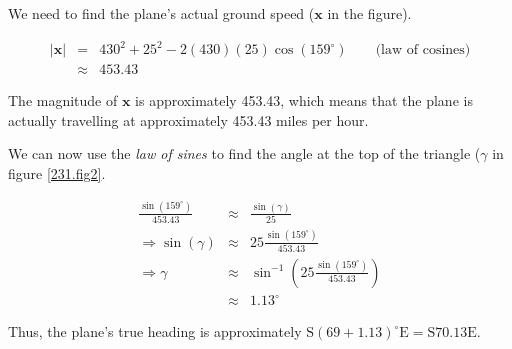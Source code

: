We need to find the plane's actual ground speed ($\mathbf{x}$ in the figure).

\begin{eqnarray*}
	\left|\mathbf{x}\right|&=&430^2+25^2-2\left(430\right)\left(25\right)\cos\left(159^\circ\right)\qquad\mbox{(law of cosines)}\\
	&\approx&453.43
\end{eqnarray*}

The magnitude of $\mathbf{x}$ is approximately 453.43, which means that the plane is actually travelling at approximately 453.43 miles per hour.

We can now use the \emph{law of sines} to find the angle at the top of the triangle ($\gamma$ in figure \vref{231.fig2}.

\begin{eqnarray*}
	\frac{\sin\left(159^\circ\right)}{453.43}&\approx&\frac{\sin\left(\gamma\right)}{25}\\
	\Rightarrow\sin\left(\gamma\right)&\approx&25\frac{\sin\left(159^\circ\right)}{453.43}\\
	\Rightarrow\gamma&\approx&\sin^{-1}\left(25\frac{\sin\left(159^\circ\right)}{453.43}\right)\\
	&\approx&1.13^\circ
\end{eqnarray*}

Thus, the plane's true heading is approximately $\mbox{S}\left(69+1.13\right)^\circ\mbox{E}=\mbox{S}70.13\mbox{E}$.
